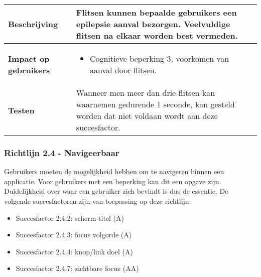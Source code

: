 \begin{table}[H]
\begin{tabular}{|l|p{12cm}|}
        \hline
        \textbf{Beschrijving}                 & Flitsen kunnen bepaalde gebruikers een epilepsie aanval bezorgen. Veelvuldige flitsen na elkaar worden best vermeden.  \\ 
        \hline
        \textbf{Impact op gebruikers}         &  
        \begin{itemize}
            \item Cognitieve beperking 3, voorkomen van aanval door flitsen.
        \end{itemize}                                                                                                                                                                                                                                                                                                                                                                                                                    \\ 
        \hline
        \textbf{Testen}                       & Wanneer men meer dan drie flitsen kan waarnemen gedurende 1 seconde, kan gesteld worden dat niet voldaan wordt aan deze succesfactor.                                                                                                                                                                                                               \\
        \hline
    \end{tabular}
    
\end{table}

\subsubsection{Richtlijn 2.4 - Navigeerbaar}
Gebruikers moeten de mogelijkheid hebben om te navigeren binnen een applicatie. Voor gebruikers met een beperking kan dit een opgave zijn. Duidelijkheid over waar een gebruiker zich bevindt is dus de essentie. De volgende succesfactoren zijn van toepassing op deze richtlijn: 
\begin{itemize}
    \item Succesfactor 2.4.2: scherm-titel (A)
            \item Succesfactor 2.4.3: focus volgorde (A)
     \item Succesfactor 2.4.4: knop/link doel (A)
        \item Succesfactor 2.4.7: zichtbare focus (AA)
\end{itemize}

